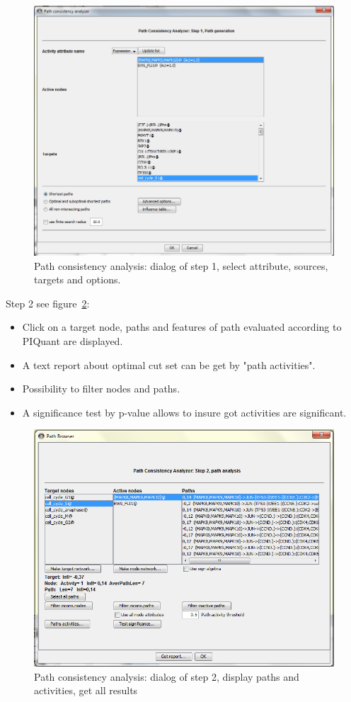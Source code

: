 \begin{figure}
\centering
\includegraphics[width=19 cm]{graphics/Path_consistency_analyser_Dialog1}
\caption{Path consistency analysis: dialog of step 1, select attribute, sources, targets and options.}
\label{Path_consistency_analyser_Dialog1}
\end{figure}
Step 2 see figure~\ref{Path_consistency_analyser_Dialog2}:
\begin{itemize}
\item Click on a target node, paths and features of path evaluated according to PIQuant are displayed.
\item A text report about optimal cut set can be get by "path activities".
\item Possibility to filter nodes and paths.
\item A  significance test by  p-value allows to insure got activities are significant.
\end{itemize}
\begin{figure}
\centering
\includegraphics[width=19 cm]{graphics/Path_consistency_analyser_Dialog2}
\caption{Path consistency analysis: dialog of step 2, display paths and activities, get all results}
\label{Path_consistency_analyser_Dialog2}
\end{figure}  

